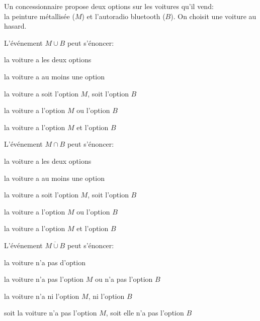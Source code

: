 \begin{QCM}
\begin{EnonceCommunQCM}
Un concessionnaire propose deux options sur les voitures qu'il vend: \\la peinture métallisée ($M$) et l'autoradio bluetooth ($B$). On choisit une voiture au hasard. 
\end{EnonceCommunQCM}
\begin{GroupeQCM}
\begin{exercice} L'événement $M\cup B$ peut s'énoncer:
\begin{ChoixQCM}{2}
\item la voiture a les deux options
\item la voiture a au moins une option
\item la voiture a soit l'option $M$, soit l'option $B$
\item la voiture a l'option $M$ ou l'option $B$
\item la voiture a l'option $M$ et l'option $B$
\end{ChoixQCM}
 \begin{corrige}
    \end{corrige}
\end{exercice}
\end{GroupeQCM}

\begin{GroupeQCM}
\begin{exercice} L'événement $M\cap B$ peut s'énoncer:
\begin{ChoixQCM}{2}
\item la voiture a les deux options
\item la voiture a au moins une option
\item la voiture a soit l'option $M$, soit l'option $B$
\item la voiture a l'option $M$ ou l'option $B$
\item la voiture a l'option $M$ et l'option $B$
\end{ChoixQCM}
 \begin{corrige}
    \end{corrige}
\end{exercice}
\end{GroupeQCM}

\begin{GroupeQCM}
\begin{exercice}L'événement $\overline{M\cup B}$ peut s'énoncer:
\begin{ChoixQCM}{2}
\item la voiture n'a pas d'option
\item la voiture n'a pas l'option $M$ ou n'a pas l'option $B$
\item la voiture n'a ni l'option $M$, ni l'option $B$
\item soit la voiture n'a pas l'option $M$, soit elle n'a pas l'option $B$
\end{ChoixQCM}
 \begin{corrige}
    \end{corrige}
\end{exercice}

\end{GroupeQCM}
\end{QCM}

